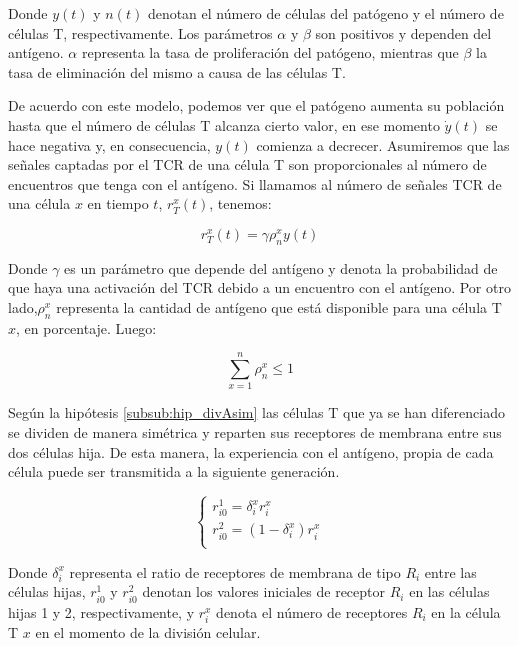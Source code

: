 Donde $y(t)$ y $n(t)$ denotan el número de células del patógeno y el número de células T, respectivamente. Los parámetros $\alpha$ y $\beta$ son positivos y dependen del antígeno. $\alpha$ representa la tasa de proliferación del patógeno, mientras que $\beta$ la tasa de eliminación del mismo a causa de las células T.

De acuerdo con este modelo, podemos ver que el patógeno aumenta su población hasta que el número de células T alcanza cierto valor, en ese momento $\dot{y}(t)$ se hace negativa y, en consecuencia, $y(t)$ comienza a decrecer. Asumiremos que las señales captadas por el TCR de una célula T son proporcionales al número de encuentros que tenga con el antígeno. Si llamamos al número de señales TCR de una célula $x$ en tiempo $t$, $r_{T}^{x}(t)$, tenemos:

\begin{equation}
	\label{ec:rhotau}
	r_{T}^{x}(t) = \gamma\rho_{n}^{x}y(t)
\end{equation}

Donde $\gamma$ es un parámetro que depende del antígeno y denota la probabilidad de que haya una activación del TCR debido a un encuentro con el antígeno. Por otro lado,$\rho_{n}^{x}$ representa la cantidad de antígeno que está disponible para una célula T $x$, en porcentaje. Luego:

\begin{equation}
	\sum_{x=1}^{n} \rho_{n}^{x} \leq 1
\end{equation}

Según la hipótesis \ref{subsub:hip_divAsim} las células T que ya se han diferenciado se dividen de manera simétrica y reparten sus receptores de membrana entre sus dos células hija. De esta manera, la experiencia con el antígeno, propia de cada célula puede ser transmitida a la siguiente generación.

\begin{equation}
	\label{sist:div_sim}
	\left\{ \begin{array}{l}
	r_{i0}^{1}= \delta_{i}^{x} r_{i}^{x}\\
	r_{i0}^{2}= (1-\delta_{i}^{x}) r_{i}^{x} \\
	\end{array}
	\right.
\end{equation}


Donde $\delta_{i}^{x}$ representa el ratio de receptores de membrana de tipo $R_{i}$ entre las células hijas, $r_{i0}^{1}$ y $r_{i0}^{2}$ denotan los valores iniciales de receptor $R_{i}$ en las células hijas 1 y 2, respectivamente, y  $r_{i}^{x}$ denota el número de receptores $R_{i}$ en la célula T $x$ en el momento de la división celular.


